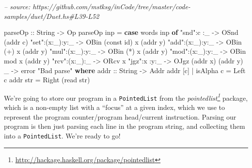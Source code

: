 \documentclass[]{article}
\newenvironment{Shaded}{}{}
\newcommand{\CommentTok}[1]{\textcolor[rgb]{0.38,0.63,0.69}{\textit{#1}}}
\newcommand{\DataTypeTok}[1]{\textcolor[rgb]{0.56,0.13,0.00}{#1}}
\newcommand{\FunctionTok}[1]{\textcolor[rgb]{0.02,0.16,0.49}{#1}}
\newcommand{\KeywordTok}[1]{\textcolor[rgb]{0.00,0.44,0.13}{\textbf{#1}}}
\newcommand{\NormalTok}[1]{#1}
\newcommand{\OtherTok}[1]{\textcolor[rgb]{0.00,0.44,0.13}{#1}}
\newcommand{\StringTok}[1]{\textcolor[rgb]{0.25,0.44,0.63}{#1}}
\renewcommand{\href}[2]{#2\footnote{\url{#1}}}
\begin{document}
\begin{Shaded}
\begin{Highlighting}[]
\CommentTok{-- source: https://github.com/mstksg/inCode/tree/master/code-samples/duet/Duet.hs#L39-L52}

\OtherTok{parseOp ::} \DataTypeTok{String} \OtherTok{->} \DataTypeTok{Op}
\NormalTok{parseOp inp }\FunctionTok{=} \KeywordTok{case}\NormalTok{ words inp }\KeywordTok{of}
    \StringTok{"snd"}\FunctionTok{:}\NormalTok{c    }\FunctionTok{:}\NormalTok{_   }\OtherTok{->} \DataTypeTok{OSnd}\NormalTok{ (addr c)}
    \StringTok{"set"}\FunctionTok{:}\NormalTok{(x}\FunctionTok{:}\NormalTok{_)}\FunctionTok{:}\NormalTok{y}\FunctionTok{:}\NormalTok{_ }\OtherTok{->} \DataTypeTok{OBin}\NormalTok{ (const id) x (addr y)}
    \StringTok{"add"}\FunctionTok{:}\NormalTok{(x}\FunctionTok{:}\NormalTok{_)}\FunctionTok{:}\NormalTok{y}\FunctionTok{:}\NormalTok{_ }\OtherTok{->} \DataTypeTok{OBin}\NormalTok{ (}\FunctionTok{+}\NormalTok{)        x (addr y)}
    \StringTok{"mul"}\FunctionTok{:}\NormalTok{(x}\FunctionTok{:}\NormalTok{_)}\FunctionTok{:}\NormalTok{y}\FunctionTok{:}\NormalTok{_ }\OtherTok{->} \DataTypeTok{OBin}\NormalTok{ (}\FunctionTok{*}\NormalTok{)        x (addr y)}
    \StringTok{"mod"}\FunctionTok{:}\NormalTok{(x}\FunctionTok{:}\NormalTok{_)}\FunctionTok{:}\NormalTok{y}\FunctionTok{:}\NormalTok{_ }\OtherTok{->} \DataTypeTok{OBin}\NormalTok{ mod        x (addr y)}
    \StringTok{"rcv"}\FunctionTok{:}\NormalTok{(x}\FunctionTok{:}\NormalTok{_)}\FunctionTok{:}\NormalTok{_   }\OtherTok{->} \DataTypeTok{ORcv}\NormalTok{ x}
    \StringTok{"jgz"}\FunctionTok{:}\NormalTok{x    }\FunctionTok{:}\NormalTok{y}\FunctionTok{:}\NormalTok{_ }\OtherTok{->} \DataTypeTok{OJgz}\NormalTok{ (addr x) (addr y)}
\NormalTok{    _               }\OtherTok{->}\NormalTok{ error }\StringTok{"Bad parse"}
  \KeywordTok{where}
\OtherTok{    addr ::} \DataTypeTok{String} \OtherTok{->} \DataTypeTok{Addr}
\NormalTok{    addr [c] }\FunctionTok{|}\NormalTok{ isAlpha c }\FunctionTok{=} \DataTypeTok{Left}\NormalTok{ c}
\NormalTok{    addr str }\FunctionTok{=} \DataTypeTok{Right}\NormalTok{ (read str)}
\end{Highlighting}
\end{Shaded}

We're going to store our program in a \texttt{PointedList} from the
\emph{\href{http://hackage.haskell.org/package/pointedlist}{pointedlist}}
package, which is a non-empty list with a ``focus'' at a given index, which we
use to represent the program counter/program head/current instruction. Parsing
our program is then just parsing each line in the program string, and collecting
them into a \texttt{PointedList}. We're ready to go!
\end{document}
